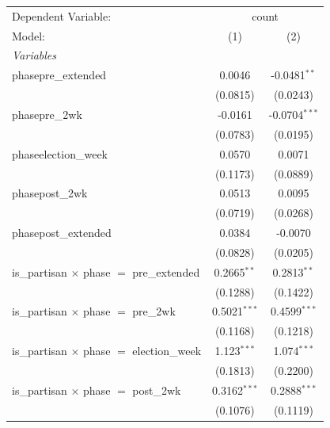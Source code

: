
\begingroup
\centering
\begin{tabular}{lcc}
   \tabularnewline \midrule \midrule
   Dependent Variable: & \multicolumn{2}{c}{count}\\
   Model:                                            & (1)            & (2)\\  
   \midrule
   \emph{Variables}\\
   phasepre\_extended                                & 0.0046         & -0.0481$^{**}$\\   
                                                     & (0.0815)       & (0.0243)\\   
   phasepre\_2wk                                     & -0.0161        & -0.0704$^{***}$\\   
                                                     & (0.0783)       & (0.0195)\\   
   phaseelection\_week                               & 0.0570         & 0.0071\\   
                                                     & (0.1173)       & (0.0889)\\   
   phasepost\_2wk                                    & 0.0513         & 0.0095\\   
                                                     & (0.0719)       & (0.0268)\\   
   phasepost\_extended                               & 0.0384         & -0.0070\\   
                                                     & (0.0828)       & (0.0205)\\   
   is\_partisan $\times$ phase $=$ pre\_extended     & 0.2665$^{**}$  & 0.2813$^{**}$\\   
                                                     & (0.1288)       & (0.1422)\\   
   is\_partisan $\times$ phase $=$ pre\_2wk          & 0.5021$^{***}$ & 0.4599$^{***}$\\   
                                                     & (0.1168)       & (0.1218)\\   
   is\_partisan $\times$ phase $=$ election\_week    & 1.123$^{***}$  & 1.074$^{***}$\\   
                                                     & (0.1813)       & (0.2200)\\   
   is\_partisan $\times$ phase $=$ post\_2wk         & 0.3162$^{***}$ & 0.2888$^{***}$\\   
                                                     & (0.1076)       & (0.1119)\\   

\end{tabular}
